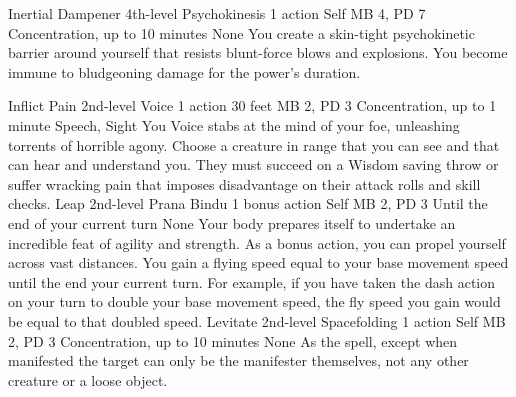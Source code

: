 \DndPowerHeader%
    {Inertial Dampener\label{pwr:inertial_dampener}}
    {4th-level Psychokinesis}
    {1 action}
    {Self}
    {MB 4, PD 7}
    {Concentration, up to 10 minutes}
    {None}
You create a skin-tight psychokinetic barrier
around yourself that resists blunt-force blows and explosions.
You become immune to bludgeoning damage for the power's duration.

\DndPowerHeader%
    {Inflict Pain\label{pwr:inflict_pain}}
    {2nd-level Voice}
    {1 action}
    {30 feet}
    {MB 2, PD 3}
    {Concentration, up to 1 minute}
    {Speech, Sight}
You Voice stabs at the mind of your foe,
unleashing torrents of horrible agony. Choose a creature in
range that you can see and that can hear and understand you.
They must succeed on a Wisdom saving
throw or suffer wracking pain that imposes disadvantage on
their attack rolls and skill checks.
\DndPowerHeader%
    {Leap\label{pwr:leap}}
    {2nd-level Prana Bindu}
    {1 bonus action}
    {Self}
    {MB 2, PD 3}
    {Until the end of your current turn}
    {None}
Your body prepares itself to undertake an
incredible feat of agility and strength. As a bonus action,
you can propel yourself across vast distances. You gain a
flying speed equal to your base movement speed until the end
your current turn. For example, if you have taken the dash
action on your turn to double your base movement speed, the
fly speed you gain would be equal to that doubled speed.
\DndPowerHeader%
    {Levitate\label{pwr:levitate}}
    {2nd-level Spacefolding}
    {1 action}
    {Self}
    {MB 2, PD 3}
    {Concentration, up to 10 minutes}
    {None}
As the  spell, except when
manifested the target can only be the manifester themselves,
not any other creature or a loose object.

